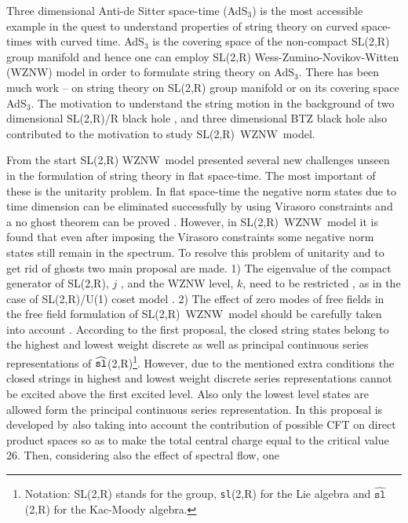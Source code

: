 \documentclass[a4paper,12pt]{article}
\begin{document}
Three dimensional Anti-de Sitter space-time (AdS$_{3}$) is the most
accessible example in the quest to understand properties of string theory on
curved space-times with curved time. AdS$_{3}$ is the covering space of the
non-compact SL(2,R) group manifold and hence one can employ SL(2,R)
Wess-Zumino-Novikov-Witten (WZNW) model in order to formulate string theory
on AdS$_{3}$. There has been much work \cite{BRFW}--\cite{MO-1} on string
theory on SL(2,R) group manifold or on its covering space AdS$_{3}$. The
motivation to understand the string motion in the background of two
dimensional SL(2,R)/R black hole \cite{BN},\cite{witten} and three
dimensional BTZ black hole \cite{BTZ} also contributed to the motivation to
study SL(2,R)\ WZNW\ model.

From the start SL(2,R) WZNW\ model presented several new challenges unseen
in the formulation of string theory in flat space-time. The most important
of these is the unitarity problem. In flat space-time the negative norm
states due to time dimension can be eliminated successfully by using
Virasoro constraints and a no ghost theorem can be proved \cite{thorn}.
However, in SL(2,R)\ WZNW\ model it is found that even after imposing the
Virasoro constraints some negative norm states still remain in the spectrum.
To resolve this problem of unitarity and to get rid of ghosts two main
proposal are made. 1) The eigenvalue of the compact generator of SL(2,R), $j$%
, and the WZNW level, $k$, need to be restricted \cite{BN},\cite{others1} as
in the case of SL(2,R)/U(1) coset model \cite{peskin}. 2) The effect of zero
modes of free fields in the free field formulation of SL(2,R)\ WZNW\ model
should be carefully taken into account \cite{bars1}. According to the first
proposal, the closed string states belong to the highest and lowest weight
discrete as well as principal continuous series representations of $\widehat{%
\mathtt{sl}}$(2,R)\footnote{%
Notation: SL(2,R) stands for the group, \texttt{sl}(2,R) for the Lie algebra
and $\widehat{\mathtt{sl}}$(2,R) for the Kac-Moody algebra.}. However, due
to the mentioned extra conditions the closed strings in highest and lowest
weight discrete series representations cannot be excited above the first
excited level. Also only the lowest level states are allowed form the
principal continuous series representation. In \cite{MO-1} this proposal is
developed by also taking into account the contribution of possible CFT on
direct product spaces so as to make the total central charge equal to the
critical value 26. Then, considering also the effect of spectral flow, one
\end{document}
